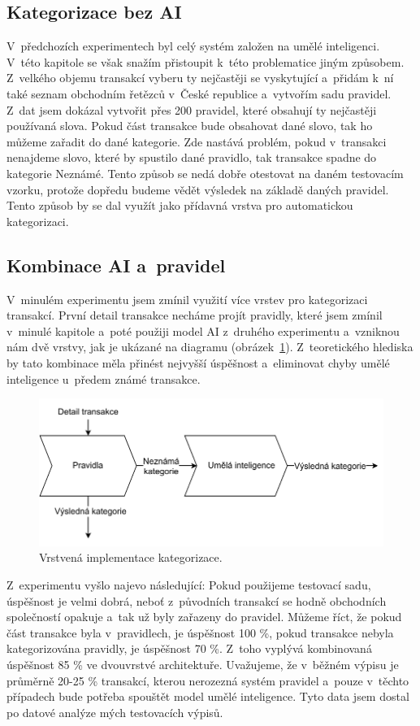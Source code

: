 \subsection{Kategorizace bez AI}
V~předchozích experimentech byl celý systém založen na umělé inteligenci. V~této kapitole se však snažím přistoupit k~této problematice jiným způsobem. Z~velkého objemu transakcí vyberu ty nejčastěji se vyskytující a~přidám k~ní také seznam obchodním řetězců v~České republice a~vytvořím sadu pravidel. Z~dat jsem dokázal vytvořit přes 200 pravidel, které obsahují ty nejčastěji používaná slova. Pokud část transakce bude obsahovat dané slovo, tak ho můžeme zařadit do dané kategorie. Zde nastává problém, pokud v~transakci nenajdeme slovo, které by spustilo dané pravidlo, tak transakce spadne do kategorie Neznámé. Tento způsob se nedá dobře otestovat na daném testovacím vzorku, protože dopředu budeme vědět výsledek na základě daných pravidel. Tento způsob by se dal využít jako přídavná vrstva pro automatickou kategorizaci.

\subsection{Kombinace AI a~pravidel}
V~minulém experimentu jsem zmínil využití více vrstev pro kategorizaci transakcí. První detail transakce necháme projít pravidly, které jsem zmínil v~minulé kapitole a~poté použiji model AI z~druhého experimentu a~vzniknou nám dvě vrstvy, jak je ukázané na diagramu (obrázek~\ref{fig:vrstvenaimplementace}).
Z~teoretického hlediska by tato kombinace měla přinést nejvyšší úspěšnost a~eliminovat chyby umělé inteligence u~předem známé transakce.
\begin{figure}[H]
\centering
\includegraphics[width=\textwidth]{obrazky-figures/vrstvy.pdf}
\caption{Vrstvená implementace kategorizace.}
\label{fig:vrstvenaimplementace}
\end{figure}
Z~experimentu vyšlo najevo následující: Pokud použijeme testovací sadu, úspěšnost je velmi dobrá, neboť z~původních transakcí se hodně obchodních společností opakuje a~tak už byly zařazeny do pravidel. Můžeme říct, že pokud část transakce byla v~pravidlech, je úspěšnost 100 \%, pokud transakce nebyla kategorizována pravidly, je úspěšnost 70 \%. Z~toho vyplývá kombinovaná úspěšnost 85 \% ve dvouvrstvé architektuře. Uvažujeme, že v~běžném výpisu je průměrně 20-25 \% transakcí, kterou nerozezná systém pravidel a~pouze v~těchto případech bude potřeba spouštět model umělé inteligence. Tyto data jsem dostal po datové analýze mých testovacích výpisů.


